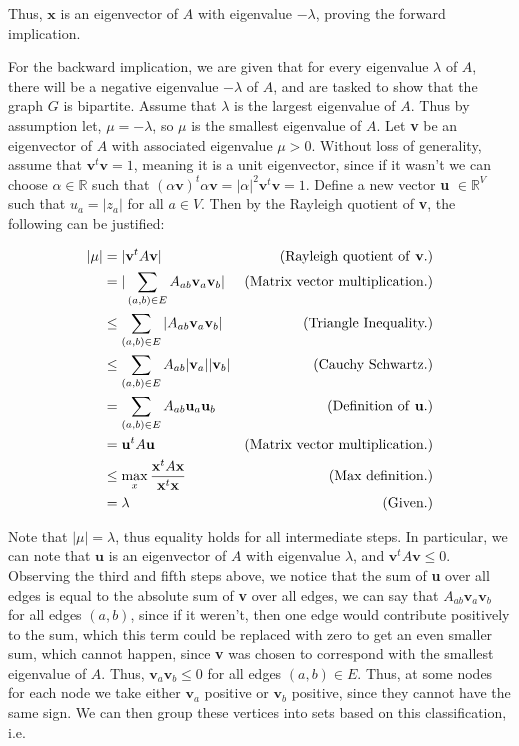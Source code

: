 \documentclass[10pt]{article}
\newcommand{\1}{\vec{\mathbbm{1}}}
\begin{document}
{Thus, $\textbf{x}$ is an eigenvector of $A$ with eigenvalue $-\lambda$, proving the forward implication. \par

\newpage
For the backward implication, we are given that for every eigenvalue $\lambda$ of $A$, there will be a negative eigenvalue $-\lambda$ of $A$, and are tasked to show that the graph $G$ is bipartite. Assume that $\lambda$ is the largest eigenvalue of $A$. Thus by assumption let, $\mu = -\lambda$, so $\mu$ is the smallest eigenvalue of $A$. Let \textbf{v} be an eigenvector of $A$ with associated eigenvalue $\mu > 0$. Without loss of generality, assume that $\textbf{v}^t\textbf{v} = 1$, meaning it is a unit eigenvector, since if it wasn't we can choose $\alpha \in \mathbb{R}$ such that $(\alpha\textbf{v})^t\alpha\textbf{v} = |\alpha|^2 \textbf{v}^t\textbf{v} = 1$.  Define a new vector \textbf{u} $\in \mathbb{R}^V$ such that $u_a = |z_a|$ for all $a \in V$. Then by the Rayleigh quotient of \textbf{v}, the following can be justified:

\vspace{-15mm}
{
\begin{align}
    |\mu| &= |\textbf{v}^tA\textbf{v}| &\text{(Rayleigh quotient of \textbf{v}.)}\nonumber\\
    &= |\sum_{(a, b) \in E} A_{ab}\textbf{v}_a\textbf{v}_b| &\text{(Matrix vector multiplication.)}\nonumber\\
    &\leq \sum_{(a, b) \in E} |A_{ab}\textbf{v}_a\textbf{v}_b| &\text{(Triangle Inequality.)}\nonumber\\
    &\leq \sum_{(a, b) \in E} A_{ab}|\textbf{v}_a||\textbf{v}_b| &\text{(Cauchy Schwartz.)}\nonumber\\
    &= \sum_{(a, b) \in E} A_{ab}\textbf{u}_a\textbf{u}_b &\text{(Definition of \textbf{u}.)}\nonumber\\
    &= \textbf{u}^tA\textbf{u} &\text{(Matrix vector multiplication.)}\nonumber\\
    &\leq \max_x \frac{\textbf{x}^tA\textbf{x}}{\textbf{x}^t\textbf{x}} &\text{(Max definition.)}\nonumber\\
    &= \lambda &\text{(Given.)}\nonumber
\end{align}
}

Note that $|\mu| = \lambda$, thus equality holds for all intermediate steps. In particular, we can note that $\textbf{u}$ is an eigenvector of $A$ with eigenvalue $\lambda$, and $\textbf{v}^tA\textbf{v} \leq 0$. Observing the third and fifth steps above, we notice that the sum of \textbf{u} over all edges is equal to the absolute sum of \textbf{v} over all edges, we can say that $A_{ab}\textbf{v}_a \textbf{v}_b$ for all edges $(a, b)$, since if it weren't, then one edge would contribute positively to the sum, which this term could be replaced with zero to get an even smaller sum, which cannot happen, since \textbf{v} was chosen to correspond with the smallest eigenvalue of $A$. Thus, $\textbf{v}_a \textbf{v}_b \leq 0$ for all edges $(a, b) \in E$. Thus, at some nodes for each node we take either $\textbf{v}_a$ positive or $\textbf{v}_b$ positive, since they cannot have the same sign. We can then group these vertices into sets based on this classification, i.e.

}
\end{document}
